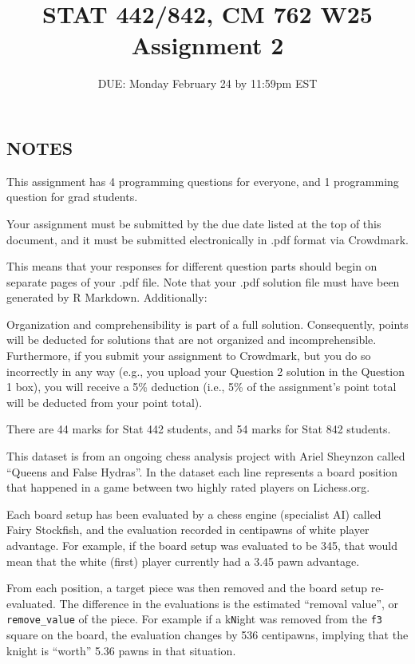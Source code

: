 \documentclass[
]{article}
\title{STAT 442/842, CM 762 W25 Assignment 2}
\subtitle{DUE: Monday February 24 by 11:59pm EST}
\author{}
\date{\vspace{-2.5em}}
\begin{document}
\maketitle

\subsection{NOTES}\label{notes}

This assignment has 4 programming questions for everyone, and 1
programming question for grad students.

Your assignment must be submitted by the due date listed at the top of
this document, and it must be submitted electronically in .pdf format
via Crowdmark.

This means that your responses for different question parts should begin
on separate pages of your .pdf file. Note that your .pdf solution file
must have been generated by R Markdown. Additionally:

Organization and comprehensibility is part of a full solution.
Consequently, points will be deducted for solutions that are not
organized and incomprehensible. Furthermore, if you submit your
assignment to Crowdmark, but you do so incorrectly in any way (e.g., you
upload your Question 2 solution in the Question 1 box), you will receive
a 5\% deduction (i.e., 5\% of the assignment's point total will be
deducted from your point total).

There are 44 marks for Stat 442 students, and 54 marks for Stat 842
students.

\newpage

This dataset is from an ongoing chess analysis project with Ariel
Sheynzon called ``Queens and False Hydras''. In the dataset each line
represents a board position that happened in a game between two highly
rated players on Lichess.org.

Each board setup has been evaluated by a chess engine (specialist AI)
called Fairy Stockfish, and the evaluation recorded in centipawns of
white player advantage. For example, if the board setup was evaluated to
be 345, that would mean that the white (first) player currently had a
3.45 pawn advantage.

From each position, a target piece was then removed and the board setup
re-evaluated. The difference in the evaluations is the estimated
``removal value'', or \texttt{remove\_value} of the piece. For example
if a k\texttt{N}ight was removed from the \texttt{f3} square on the
board, the evaluation changes by 536 centipawns, implying that the
knight is ``worth'' 5.36 pawns in that situation.
\end{document}
